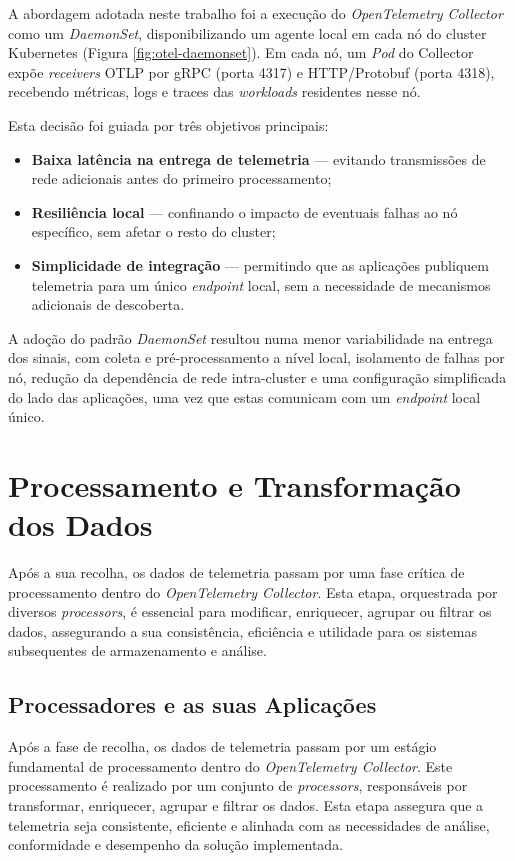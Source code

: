 A abordagem adotada neste trabalho foi a execução do \textit{OpenTelemetry Collector} como um \textit{DaemonSet}, disponibilizando um agente local em cada nó do cluster Kubernetes (Figura \ref{fig:otel-daemonset}). Em cada nó, um \textit{Pod} do Collector expõe \textit{receivers} OTLP por gRPC (porta 4317) e HTTP/Protobuf (porta 4318), recebendo métricas, logs e traces das \textit{workloads} residentes nesse nó.

Esta decisão foi guiada por três objetivos principais:

\begin{itemize}
    \item \textbf{Baixa latência na entrega de telemetria} --- evitando transmissões de rede adicionais antes do primeiro processamento;
    \item \textbf{Resiliência local} --- confinando o impacto de eventuais falhas ao nó específico, sem afetar o resto do cluster;
    \item \textbf{Simplicidade de integração} --- permitindo que as aplicações publiquem telemetria para um único \textit{endpoint} local, sem a necessidade de mecanismos adicionais de descoberta.
\end{itemize}

A adoção do padrão \textit{DaemonSet} resultou numa menor variabilidade na entrega dos sinais, com coleta e pré-processamento a nível local, isolamento de falhas por nó, redução da dependência de rede intra-cluster e uma configuração simplificada do lado das aplicações, uma vez que estas comunicam com um \textit{endpoint} local único.


\section{Processamento e Transformação dos Dados}

Após a sua recolha, os dados de telemetria passam por uma fase crítica de processamento dentro do \textit{OpenTelemetry Collector}. Esta etapa, orquestrada por diversos \textit{processors}, é essencial para modificar, enriquecer, agrupar ou filtrar os dados, assegurando a sua consistência, eficiência e utilidade para os sistemas subsequentes de armazenamento e análise.


\subsection{Processadores e as suas Aplicações}

Após a fase de recolha, os dados de telemetria passam por um estágio fundamental de processamento dentro do \textit{OpenTelemetry Collector}. Este processamento é realizado por um conjunto de \textit{processors}, responsáveis por transformar, enriquecer, agrupar e filtrar os dados. Esta etapa assegura que a telemetria seja consistente, eficiente e alinhada com as necessidades de análise, conformidade e desempenho da solução implementada.

